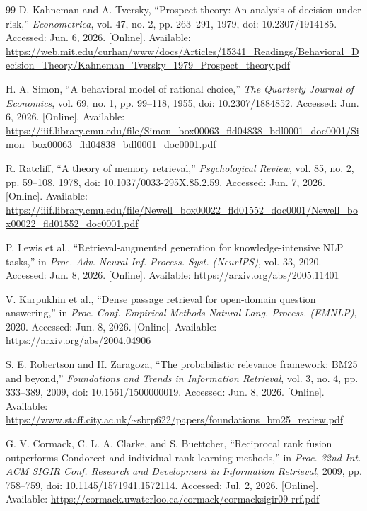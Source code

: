 \begin{thebibliography}{99}
D. Kahneman and A. Tversky, ``Prospect theory: An analysis of decision under
risk,'' \emph{Econometrica}, vol. 47, no. 2, pp. 263--291, 1979, doi:
10.2307/1914185. Accessed: Jun. 6, 2026. [Online]. Available:
\url{https://web.mit.edu/curhan/www/docs/Articles/15341_Readings/Behavioral_Decision_Theory/Kahneman_Tversky_1979_Prospect_theory.pdf}

H. A. Simon, ``A behavioral model of rational choice,'' \emph{The Quarterly
Journal of Economics}, vol. 69, no. 1, pp. 99--118, 1955, doi:
10.2307/1884852. Accessed: Jun. 6, 2026. [Online]. Available:
\url{https://iiif.library.cmu.edu/file/Simon_box00063_fld04838_bdl0001_doc0001/Simon_box00063_fld04838_bdl0001_doc0001.pdf}

R. Ratcliff, ``A theory of memory retrieval,'' \emph{Psychological Review},
vol. 85, no. 2, pp. 59--108, 1978, doi: 10.1037/0033-295X.85.2.59.
Accessed: Jun. 7, 2026. [Online]. Available:
\url{https://iiif.library.cmu.edu/file/Newell_box00022_fld01552_doc0001/Newell_box00022_fld01552_doc0001.pdf}

P. Lewis et al., ``Retrieval-augmented generation for knowledge-intensive NLP
tasks,'' in \emph{Proc. Adv. Neural Inf. Process. Syst. (NeurIPS)}, vol. 33,
2020. Accessed: Jun. 8, 2026. [Online]. Available:
\url{https://arxiv.org/abs/2005.11401}

V. Karpukhin et al., ``Dense passage retrieval for open-domain question
answering,'' in \emph{Proc. Conf. Empirical Methods Natural Lang. Process.
(EMNLP)}, 2020. Accessed: Jun. 8, 2026. [Online]. Available:
\url{https://arxiv.org/abs/2004.04906}

S. E. Robertson and H. Zaragoza, ``The probabilistic relevance framework:
BM25 and beyond,'' \emph{Foundations and Trends in Information Retrieval},
vol. 3, no. 4, pp. 333--389, 2009, doi: 10.1561/1500000019. Accessed:
Jun. 8, 2026. [Online]. Available:
\url{https://www.staff.city.ac.uk/~sbrp622/papers/foundations_bm25_review.pdf}

G. V. Cormack, C. L. A. Clarke, and S. Buettcher, ``Reciprocal rank fusion
outperforms Condorcet and individual rank learning methods,'' in
\emph{Proc. 32nd Int. ACM SIGIR Conf. Research and Development in Information
Retrieval}, 2009, pp. 758--759, doi: 10.1145/1571941.1572114. Accessed:
Jul. 2, 2026. [Online]. Available:
\url{https://cormack.uwaterloo.ca/cormack/cormacksigir09-rrf.pdf}


\end{thebibliography}
